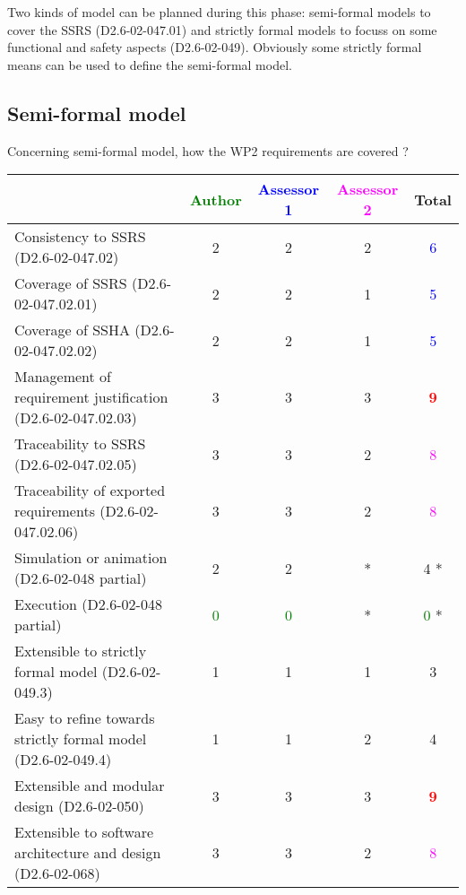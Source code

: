 Two kinds of model can be planned during this phase: semi-formal models to cover the SSRS (D2.6-02-047.01) and strictly formal models to focuss on some functional and safety aspects (D2.6-02-049). Obviously some strictly formal means can be used to define the semi-formal model.

\subsection{Semi-formal model}

Concerning semi-formal model, how the WP2 requirements are covered ?

\begin{tabular}{|l | c | c | c | c|}
\hline
& \textcolor{green}{Author} & \textcolor{blue}{Assessor 1} & \textcolor{magenta}{Assessor 2} & Total \\
\hline
Consistency to SSRS (D2.6-02-047.02) & 2     & 2     & 2     & \textcolor{blue}{6} \\
\hline
Coverage of SSRS (D2.6-02-047.02.01) & 2     & 2     & 1     & \textcolor{blue}{5} \\
\hline
Coverage of SSHA (D2.6-02-047.02.02) & 2     & 2     & 1     & \textcolor{blue}{5} \\
\hline
Management of requirement justification (D2.6-02-047.02.03) & 3     & 3     & 3     & \textcolor{red}{\textbf{9}} \\
\hline
Traceability to SSRS (D2.6-02-047.02.05) & 3     & 3     & 2     & \textcolor{magenta}{8} \\
\hline
Traceability of exported requirements (D2.6-02-047.02.06) & 3     & 3     & 2     & \textcolor{magenta}{8} \\
\hline
Simulation or animation (D2.6-02-048 partial) & 2     & 2     &  * & 4    * \\
\hline
Execution (D2.6-02-048 partial) & \textcolor{green}{0} & \textcolor{green}{0} & * & \textcolor{green}{0} * \\
\hline
Extensible to strictly formal model (D2.6-02-049.3) & 1     & 1     & 1     & 3     \\
\hline
Easy to refine towards strictly formal model (D2.6-02-049.4) & 1     & 1     & 2     & 4     \\
\hline
Extensible and modular design (D2.6-02-050) & 3     & 3     & 3     & \textcolor{red}{\textbf{9}} \\
\hline
Extensible to software architecture and design (D2.6-02-068) & 3     & 3     & 2     & \textcolor{magenta}{8} \\
\hline
\end{tabular}



